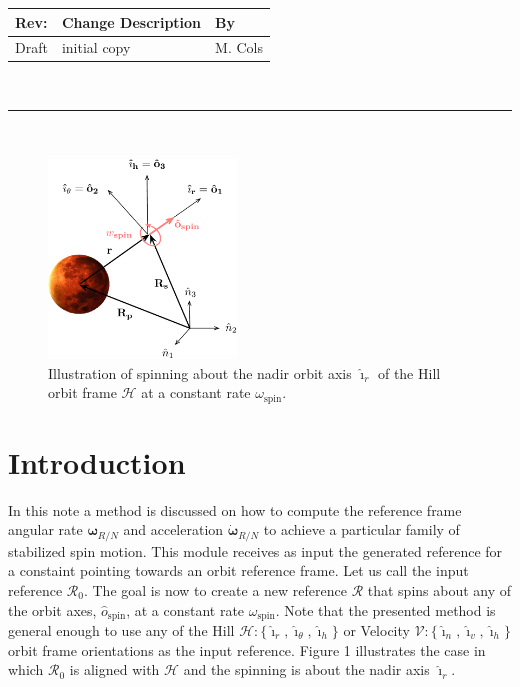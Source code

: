 \documentclass[]{AVSSimReportMemo}
\begin{document}
\makeCover


%
%
\pagestyle{empty}
{\renewcommand{\arraystretch}{2}
\noindent
\begin{longtable}{|p{0.5in}|p{4.5in}|p{1.14in}|}
\hline
{\bfseries Rev}: & {\bfseries Change Description} & {\bfseries By} \\
\hline
Draft & initial copy & M. Cols \\
\hline

\end{longtable}
}

\newpage
\setcounter{page}{1}
\pagestyle{fancy}

\tableofcontents
~\\ \hrule ~\\

\begin{figure}[htb]
	\centerline{
	\includegraphics[width=5cm]{Figures/Fig1}
	}
	\caption{Illustration of spinning about the nadir orbit axis $\bm\hat{\imath}_{r}$ of the Hill orbit frame $\mathcal{H}$  at a constant rate $\omega_{\textrm{spin}}$.}
	\label{fig:Fig1}
\end{figure}

\section{Introduction}
In this note a method is discussed on how to compute the reference frame angular rate $\bm\omega_{R/N}$ and acceleration $\dot{\bm\omega}_{R/N}$ to achieve a particular family of stabilized spin motion. This module receives as input the generated reference for a constaint pointing towards an orbit reference frame. Let us call the input reference $\mathcal{R}_{0}$. The goal is now to create a new reference $\mathcal{R}$ that spins about any of the orbit axes, $\hat {o}_{\textrm{spin}}$, at a constant rate $\omega_{\textrm{spin}}$. Note that the presented method is general enough to use any of the Hill $\mathcal{H}:\{ \hat{\bm\imath}_{r}, \hat{\bm\imath}_{\theta}, \hat{\bm\imath}_{h} \}$ or Velocity $\mathcal{V}:\{ \hat{\bm\imath}_{n}, \hat{\bm\imath}_{v}, \hat{\bm\imath}_{h} \}$ orbit frame orientations as the input reference. Figure 1 illustrates the case in which $\mathcal{R}_{0}$ is aligned with $\mathcal{H}$ and the spinning is about the nadir axis $\hat{\bm\imath}_{r}$.
\end{document}
